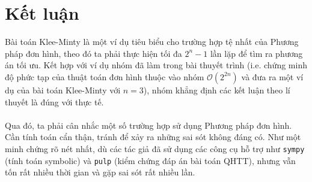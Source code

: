 \documentclass[12pt]{article}
\begin{document}
\section{Kết luận}
Bài toán Klee-Minty là một ví dụ tiêu biểu cho trường hợp tệ nhất của Phương pháp đơn hình, theo đó ta phải thực hiện tối đa $2^n - 1$ lần lặp để tìm ra phương án tối ưu. Kết hợp với ví dụ nhóm đã làm trong bài thuyết trình (i.e. chứng minh độ phức tạp của thuật toán đơn hình thuộc vào nhóm $\mathcal{O}(2^{2n})$ và đưa ra một ví dụ của bài toán Klee-Minty với $n = 3$)\cite{Nhom132022}, nhóm khẳng định các kết luận theo lí thuyết là đúng với thực tế.\\\\
Qua đó, ta phải cân nhắc một số trường hợp sử dụng Phương pháp đơn hình. Cần tính toán cẩn thận, tránh để xảy ra những sai sót không đáng có. Như một minh chứng rõ nét nhất, dù các tác giả đã sử dụng các công cụ hỗ trợ như \texttt{sympy} (tính toán symbolic) và \texttt{pulp} (kiểm chứng đáp án bài toán QHTT), nhưng vẫn tốn rất nhiều thời gian và gặp sai sót rất nhiều lần.



\end{document}
